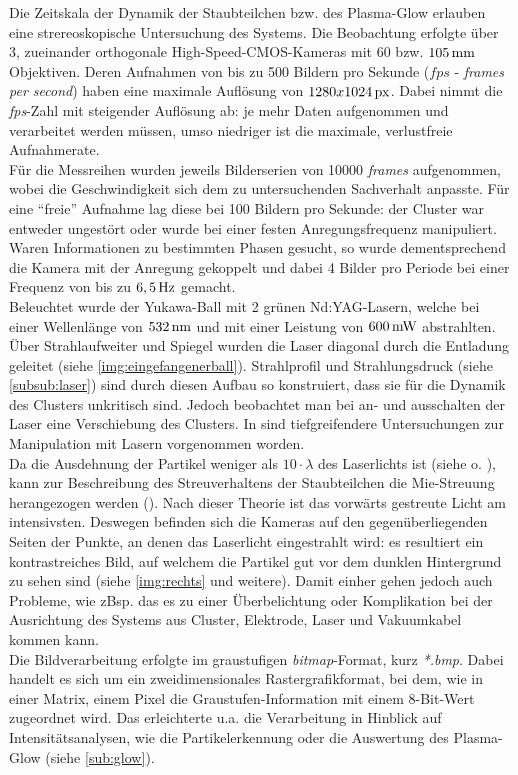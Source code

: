 \documentclass[numbers=noenddot,a4paper]{scrartcl}
\newcommand{\tilt}[1]{\textit{#1}}
\begin{document}
			Die Zeitskala der Dynamik der Staubteilchen bzw. des Plasma-Glow erlauben eine strereoskopische Untersuchung des Systems. Die Beobachtung erfolgte \"uber 3, zueinander orthogonale High-Speed-CMOS-Kameras mit 60 bzw. $\unit[105]{mm}$ Objektiven. Deren Aufnahmen von bis zu 500 Bildern pro Sekunde ($\unit{fps}$ - \tilt{frames per second}) haben eine maximale Aufl\"osung von $\unit[1280x1024]{px}$. Dabei nimmt die \tilt{fps}-Zahl mit steigender Auflösung ab: je mehr Daten aufgenommen und verarbeitet werden müssen, umso niedriger ist die maximale, verlustfreie Aufnahmerate.\\
			Für die Messreihen wurden jeweils Bilderserien von 10000 \tilt{frames} aufgenommen, wobei die Geschwindigkeit sich dem zu untersuchenden Sachverhalt anpasste. F\"ur eine "`freie"' Aufnahme lag diese bei 100 Bildern pro Sekunde: der Cluster war entweder ungest\"ort oder wurde bei einer festen Anregungsfrequenz manipuliert. Waren Informationen zu bestimmten Phasen gesucht, so wurde dementsprechend die Kamera mit der Anregung gekoppelt und dabei 4 Bilder pro Periode bei einer Frequenz von bis zu $\unit[6,5]{Hz}$ gemacht. \\
			Beleuchtet wurde der Yukawa-Ball mit 2 gr\"unen Nd:YAG-Lasern, welche bei einer Wellenl\"ange von $\unit[532]{nm}$ und mit einer Leistung von $\unit[600]{mW}$ abstrahlten. Über Strahlaufweiter und Spiegel wurden die Laser diagonal durch die Entladung geleitet (siehe \ref{img:eingefangenerball}). Strahlprofil und Strahlungsdruck (siehe \ref{subsub:laser}) sind durch diesen Aufbau so konstruiert, dass sie f\"ur die Dynamik des Clusters unkritisch sind. Jedoch beobachtet man bei an- und ausschalten der Laser eine Verschiebung des Clusters. In \cite{Mulsow13} sind tiefgreifendere Untersuchungen zur Manipulation mit Lasern vorgenommen worden.\\
			Da die Ausdehnung der Partikel weniger als $10\cdot\lambda$ des Laserlichts ist (siehe \cite{Mie08} o. \cite{Hulst81}), kann zur Beschreibung des Streuverhaltens der Staubteilchen die Mie-Streuung herangezogen werden (\cite{Bonitz10}). Nach dieser Theorie ist das vorw\"arts gestreute Licht am intensivsten. Deswegen befinden sich die Kameras auf den gegen\"uberliegenden Seiten der Punkte, an denen das Laserlicht eingestrahlt wird: es resultiert ein kontrastreiches Bild, auf welchem die Partikel gut vor dem dunklen Hintergrund zu sehen sind (siehe \ref{img:rechts} und weitere). Damit einher gehen jedoch auch Probleme, wie zBsp. das es zu einer \"Uberbelichtung oder Komplikation bei der Ausrichtung des Systems aus Cluster, Elektrode, Laser und Vakuumkabel kommen kann.\\
			Die Bildverarbeitung erfolgte im graustufigen \tilt{bitmap}-Format, kurz \tilt{*.bmp}. Dabei handelt es sich um ein zweidimensionales Rastergrafikformat, bei dem, wie in einer Matrix, einem Pixel die Graustufen-Information mit einem 8-Bit-Wert zugeordnet wird. Das erleichterte u.a. die Verarbeitung in Hinblick auf Intensit\"atsanalysen, wie die Partikelerkennung oder die Auswertung des Plasma-Glow (siehe \ref{sub:glow}).
            
\end{document}
